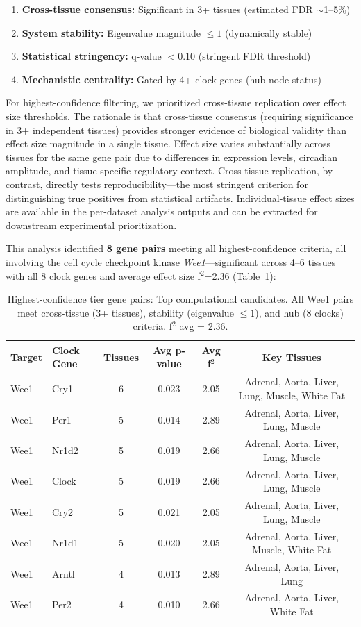 \documentclass[11pt,a4paper]{article}
\begin{document}
\begin{enumerate}
    \item \textbf{Cross-tissue consensus:} Significant in 3+ tissues (estimated FDR $\sim$1--5\%)
    \item \textbf{System stability:} Eigenvalue magnitude $\leq 1$ (dynamically stable)
    \item \textbf{Statistical stringency:} q-value $< 0.10$ (stringent FDR threshold)
    \item \textbf{Mechanistic centrality:} Gated by 4+ clock genes (hub node status)
\end{enumerate}

For highest-confidence filtering, we prioritized cross-tissue replication over effect size thresholds. The rationale is that cross-tissue consensus (requiring significance in 3+ independent tissues) provides stronger evidence of biological validity than effect size magnitude in a single tissue. Effect size varies substantially across tissues for the same gene pair due to differences in expression levels, circadian amplitude, and tissue-specific regulatory context. Cross-tissue replication, by contrast, directly tests reproducibility---the most stringent criterion for distinguishing true positives from statistical artifacts. Individual-tissue effect sizes are available in the per-dataset analysis outputs and can be extracted for downstream experimental prioritization.

This analysis identified \textbf{8 gene pairs} meeting all highest-confidence criteria, all involving the cell cycle checkpoint kinase \textit{Wee1}---significant across 4--6 tissues with all 8 clock genes and average effect size f$^2$=2.36 (Table~\ref{tab:tier0}):

\begin{table}[H]
\centering
\caption{Highest-confidence tier gene pairs: Top computational candidates. All Wee1 pairs meet cross-tissue (3+ tissues), stability (eigenvalue $\leq 1$), and hub (8 clocks) criteria. f$^2$ avg = 2.36.}
\label{tab:tier0}
\begin{tabular}{llcccc}
\toprule
Target & Clock Gene & Tissues & Avg p-value & Avg f$^2$ & Key Tissues \\
\midrule
Wee1 & Cry1 & 6 & 0.023 & 2.05 & Adrenal, Aorta, Liver, Lung, Muscle, White Fat \\
Wee1 & Per1 & 5 & 0.014 & 2.89 & Adrenal, Aorta, Liver, Lung, Muscle \\
Wee1 & Nr1d2 & 5 & 0.019 & 2.66 & Adrenal, Aorta, Liver, Lung, Muscle \\
Wee1 & Clock & 5 & 0.019 & 2.66 & Adrenal, Aorta, Liver, Lung, Muscle \\
Wee1 & Cry2 & 5 & 0.021 & 2.05 & Adrenal, Aorta, Liver, Lung, Muscle \\
Wee1 & Nr1d1 & 5 & 0.020 & 2.05 & Adrenal, Aorta, Liver, Muscle, White Fat \\
Wee1 & Arntl & 4 & 0.013 & 2.89 & Adrenal, Aorta, Liver, Lung \\
Wee1 & Per2 & 4 & 0.010 & 2.66 & Adrenal, Aorta, Liver, White Fat \\
\bottomrule
\end{tabular}
\end{table}
\end{document}
